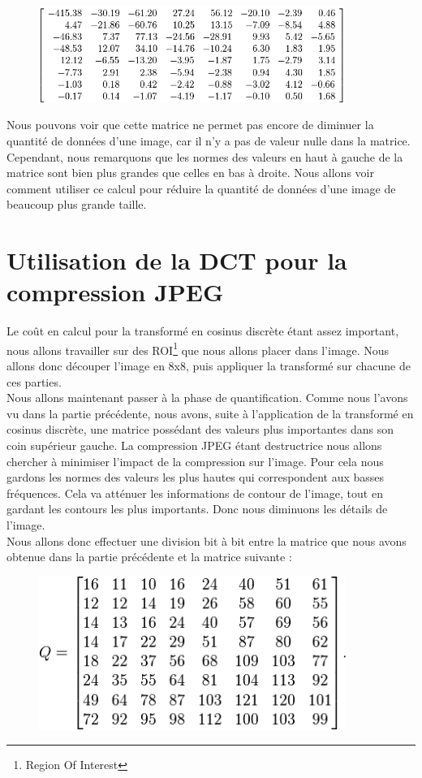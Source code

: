\documentclass[a4paper,11pt]{article}
\begin{document}
  \begin{figure}[H]
    \center
   \includegraphics[width=10cm]{matrice_cosinus.png}
  \end{figure}

  Nous pouvons voir que cette matrice ne permet pas encore de diminuer la quantité de données d'une image, car il n'y a pas de valeur 
  nulle dans la matrice. Cependant, nous remarquons que les normes des valeurs en haut à gauche de la matrice sont bien plus grandes 
  que celles en bas à droite. Nous allons voir comment utiliser ce calcul pour réduire la quantité de données d'une image de beaucoup 
  plus grande taille.
  
  \section{Utilisation de la DCT pour la compression JPEG}
  Le coût en calcul pour la transformé en cosinus discrète étant assez important, nous allons travailler sur des ROI\footnote{Region Of Interest}
  que nous allons placer dans l'image. Nous allons donc découper l'image en 8x8, puis appliquer la transformé sur chacune de ces parties.\\
  
  Nous allons maintenant passer à la phase de quantification. Comme nous l'avons vu dans la partie précédente, nous avons, suite à
  l'application de la transformé en cosinus discrète, une matrice possédant des valeurs plus importantes dans son coin supérieur
  gauche. La compression JPEG étant destructrice nous allons chercher à minimiser l'impact de la compression sur l'image.
  Pour cela nous gardons les normes des valeurs les plus hautes qui correspondent aux basses fréquences. Cela va atténuer
  les informations de contour de l'image, tout en gardant les contours les plus importants. Donc nous diminuons les
  détails de l'image.\\
  
  Nous allons donc effectuer une division bit à bit entre la matrice que nous avons obtenue dans la partie précédente 
  et la matrice suivante : 
  \begin{figure}[H]
    \center
   \includegraphics[width=10cm]{quantification.png}
  \end{figure}
  
\end{document}
